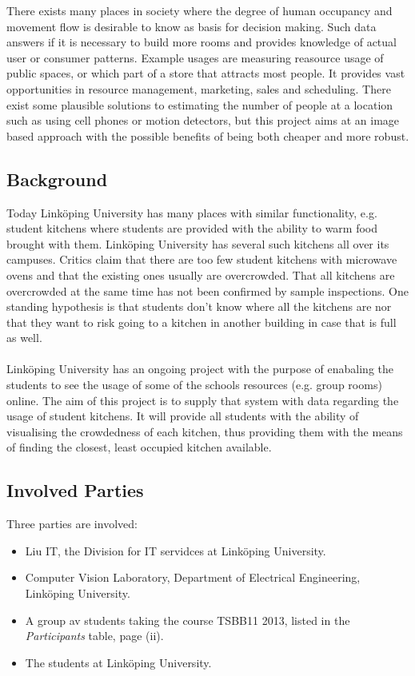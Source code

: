 There exists many places in society where the degree of human occupancy and movement flow is desirable to know as basis for decision making. Such data answers if it is necessary to build more rooms and provides knowledge of actual user or consumer patterns. Example usages are measuring reasource usage of public spaces, or which part of a store that attracts most people. It provides vast opportunities in resource management, marketing, sales and scheduling. There exist some plausible solutions to estimating the number of people at a location such as using cell phones or motion detectors, but this project aims at an image based approach with the possible benefits of being both cheaper and more robust.

\subsection{Background}
Today Linköping University has many places with similar functionality, e.g. student kitchens where students are provided with the ability to warm food brought with them. Linköping University has several such kitchens all over its campuses. Critics claim that there are too few student kitchens with microwave ovens and that the existing ones usually are overcrowded. That all kitchens are overcrowded at the same time has not been confirmed by sample inspections. One standing hypothesis is that students don't know where all the kitchens are nor that they want to risk going to a kitchen in another building in case that is full as well.\\
\\
Linköping University has an ongoing project with the purpose of enabaling the students to see the usage of some of the schools resources (e.g. group rooms) online. The aim of this project is to supply that system with data regarding the usage of student kitchens. It will provide all students with the ability of visualising the crowdedness of each kitchen, thus providing them with the means of finding the closest, least occupied kitchen available.

\subsection{Involved Parties}
Three parties are involved:
\begin{itemize}
\item Liu IT, the Division for IT servidces at Linköping University.
\item Computer Vision Laboratory, Department of Electrical Engineering, Linköping University.
\item A group av students taking the course TSBB11 2013, listed in the \textit{Participants} table, page (ii).
\item The students at Linköping University.
\end{itemize}

